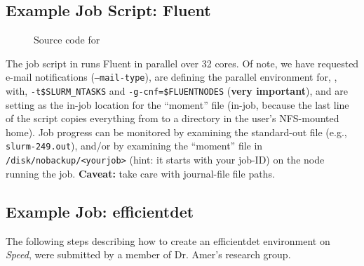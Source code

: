 \subsection{Example Job Script: Fluent}

\begin{figure}[htpb]
    
    \caption{Source code for }
	\label{fig:fluent.sh}
\end{figure}

The job script in  runs Fluent in parallel over 32 cores. 
Of note, we have requested e-mail notifications (\texttt{--mail-type}), are defining the 
parallel environment for, , with, \texttt{-t\$SLURM\_NTASKS} and \texttt{-g-cnf=\$FLUENTNODES} (\textbf{very 
important}), and are setting  as the in-job location for the
``moment''  file (in-job, because the last line of the script 
copies everything from  to a directory in the user's NFS-mounted home). 
Job progress can be monitored by examining the standard-out file (e.g.,
\texttt{slurm-249.out}), and/or by examining the ``moment'' file in 
\texttt{/disk/nobackup/<yourjob>} (hint: it starts with your job-ID) on the node running
the job. \textbf{Caveat:} take care with journal-file file paths.

\subsection{Example Job: efficientdet}

The following steps describing how to create an efficientdet environment on
\emph{Speed}, were submitted by a member of Dr. Amer's research group.

